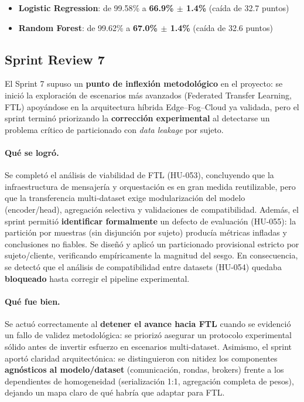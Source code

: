 \documentclass{report}
\begin{document}
\begin{itemize}
    \item \textbf{Logistic Regression}: de 99.58\% a \textbf{66.9\% $\pm$ 1.4\%} (caída de 32.7 puntos)
    \item \textbf{Random Forest}: de 99.62\% a \textbf{67.0\% $\pm$ 1.4\%} (caída de 32.6 puntos)
\end{itemize}


\subsection{Sprint Review 7}
El Sprint 7 supuso un \textbf{punto de inflexión metodológico} en el proyecto: se inició la exploración de escenarios más avanzados (Federated Transfer Learning, FTL) apoyándose en la arquitectura híbrida Edge--Fog--Cloud ya validada, pero el sprint terminó priorizando la \textbf{corrección experimental} al detectarse un problema crítico de particionado con \emph{data leakage} por sujeto.

\vspace{0.15em}
\paragraph{Qué se logró.}
Se completó el análisis de viabilidad de FTL (HU-053), concluyendo que la infraestructura de mensajería y orquestación es en gran medida reutilizable, pero que la transferencia multi-dataset exige modularización del modelo (encoder/head), agregación selectiva y validaciones de compatibilidad.
Además, el sprint permitió \textbf{identificar formalmente} un defecto de evaluación (HU-055): la partición por muestras (sin disjunción por sujeto) producía métricas infladas y conclusiones no fiables. Se diseñó y aplicó un particionado provisional estricto por sujeto/cliente, verificando empíricamente la magnitud del sesgo.
En consecuencia, se detectó que el análisis de compatibilidad entre datasets (HU-054) quedaba \textbf{bloqueado} hasta corregir el pipeline experimental.

\vspace{0.15em}
\paragraph{Qué fue bien.}
Se actuó correctamente al \textbf{detener el avance hacia FTL} cuando se evidenció un fallo de validez metodológica: se priorizó asegurar un protocolo experimental sólido antes de invertir esfuerzo en escenarios multi-dataset.
Asimismo, el sprint aportó claridad arquitectónica: se distinguieron con nitidez los componentes \textbf{agnósticos al modelo/dataset} (comunicación, rondas, brokers) frente a los dependientes de homogeneidad (serialización 1:1, agregación completa de pesos), dejando un mapa claro de qué habría que adaptar para FTL.
\end{document}
